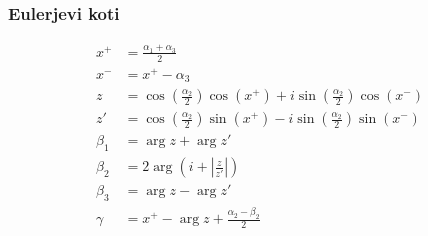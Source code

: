 \documentclass[10pt]{beamer}
\begin{document}
\begin{frame}
  \frametitle{Eulerjevi koti}
  \begin{align*}
    x^+ &= \frac{\alpha_1 + \alpha_3}{2}\\
    x^- &= x^+-\alpha_3\\
    z &= \cos\left(\frac{\alpha_2}{2}\right)\cos\left(x^+\right) + i\sin\left(\frac{\alpha_2}{2}\right)\cos\left(x^-\right)\\
    z' &= \cos\left(\frac{\alpha_2}{2}\right)\sin\left(x^+\right) - i\sin\left(\frac{\alpha_2}{2}\right)\sin\left(x^-\right)\\
  \beta_1 &= \arg z + \arg z'\\
  \beta_2 &= 2\arg\left(i+\left\lvert\frac{z}{z'}\right\rvert\right)\\
  \beta_3 &= \arg z - \arg z'\\
  \gamma &= x^+-\arg z + \frac{\alpha_2-\beta_2}{2}
\end{align*}
\end{frame}
\end{document}
